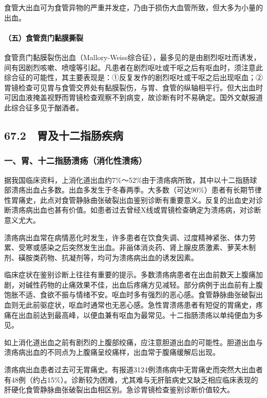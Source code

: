食管大出血可为食管异物的严重并发症，乃由于损伤大血管所致，但大多为小量的出血。

\paragraph{（五）食管贲门黏膜撕裂}

食管贲门黏膜裂伤出血（Mallory-Weiss综合征），最多见的是由剧烈呕吐而诱发，间有因剧烈咳嗽、喷嚏等引起。凡患者在剧烈呕吐或干呕之后有呕血时，须注意此综合征的可能性，其主要表现是：①反复发作的剧烈呕吐或干呕之后出现呕血；②胃镜检查可见胃与食管交界处有黏膜裂伤，与胃、食管的纵轴相平行。但大出血时可因血液掩盖视野而胃镜检查观察不到病变，故诊断有时不易确定。国外文献报道此综合征多见于酗酒者。

\protect\hypertarget{text00168.html}{}{}

\subsection{67.2　胃及十二指肠疾病}

\subsubsection{一、胃、十二指肠溃疡（消化性溃疡）}

据我国临床资料，上消化道出血约7\%～52\%由于溃疡病所致，其中以十二指肠球部溃疡出血占多数。出血多发生于冬春两季。大多数（可达90\%）患者有长期节律性胃痛史，此点对食管静脉曲张破裂出血鉴别诊断有重要意义。反复的出血史对诊断溃疡病出血也甚有价值。如患者过去曾经X线或胃镜检查确定为溃疡病，对诊断意义尤大。

溃疡病出血常在病情恶化时发生，许多患者在饮食失调、过度精神紧张、体力劳累、受寒或感染之后突然发生出血。非甾体消炎药、肾上腺皮质激素、萝芙木制剂、磺胺类药物、抗凝剂等，均可为溃疡病出血的诱发因素。

临床症状在鉴别诊断上往往有重要的提示。多数溃疡病患者在出血前数天上腹痛加剧，对碱性药物的止痛效果不佳，出血后疼痛方见减轻。部分病例于出血前有上腹饱胀不适、食欲不振与情绪不安。呕血时多有强烈的恶心感。食管静脉曲张破裂出血则无此前驱症状，呕血时通常也无恶心感。急性胃溃疡患者有短促的胃痛史，疼痛在出血前达到最高峰，以便血兼有呕血为最常见。十二指肠溃疡以单纯便血为多见。

如上消化道出血之前有剧烈的上腹部绞痛，应注意胆道出血的可能性。胆道出血与溃疡病出血的不同点为上腹痛呈绞痛样，出血常于腹痛缓解后出现。

溃疡病出血患者过去可无胃痛史。有报道3124例溃疡病中无胃痛史而突然大出血者有48例（约占15\%）。诊断较为困难，尤其难与无肝脏病史又缺乏相应临床表现的肝硬化食管静脉曲张破裂出血相区别。急诊胃镜检查鉴别诊断价值较大。


